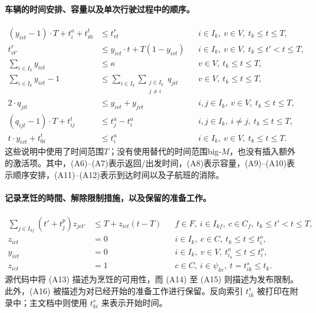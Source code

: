 \documentclass{article}
\begin{document}
\paragraph{车辆的时间安排、容量以及单次行驶过程中的顺序。}
\begin{align}
(y_{ivt}-1)\cdot T+t_i^a+t_{i0}^t
 &\leq t_{vt}^r
 &&i\in I_k,\ v\in V,\ t_k\leq t\leq T, \tag{A6}\\
t_{vt'}^r
 &\leq y_{ivt}\cdot t+T(1-y_{ivt})
 &&i\in I_k,\ v\in V,\ t_k\leq t'<t\leq T, \tag{A7}\\
\sum_{i\in I_k}y_{ivt}
 &\leq\kappa
 &&v\in V,\ t_k\leq t\leq T, \tag{A8}\\
\sum_{i\in I_k}y_{ivt}-1
 &\leq\sum_{i\in I_k}\sum_{\substack{j\in I_k\\j\ne i}}q_{jit}
 &&v\in V,\ t_k\leq t\leq T, \tag{A9}\\
2\cdot q_{jit}
 &\leq y_{ivt}+y_{jvt}
 &&i,j\in I_k,\ v\in V,\ t_k\leq t\leq T, \tag{A10}\\
(q_{ijt}-1)\cdot T+t_{ij}^t
 &\leq t_j^a-t_i^a
 &&i,j\in I_k,\ i\ne j,\ t_k\leq t\leq T, \tag{A11}\\
t\cdot y_{ivt}+t_{0i}^t
 &\leq t_i^a
 &&i\in I_k,\ v\in V,\ t_k\leq t\leq T. \tag{A12}
\end{align}
这些说明中使用了时间范围\(T\)；没有使用替代的时间范围big-\(M\)，也没有插入额外的激活项。其中，(A6)--(A7)表示返回/出发时间，(A8)表示容量，(A9)--(A10)表示顺序安排，(A11)--(A12)表示到达时间以及子航班的消除。

\paragraph{记录烹饪的時間、解除限制措施，以及保留的准备工作。}
\begin{align}
\sum_{j\in I_{kf}}(t'+t_j^p)z_{jct'}
 &\leq T+z_{ict}(t-T)
 &&f\in F,\ i\in I_{kf},\ c\in C_f,\ t_k\leq t'<t\leq T, \tag{A13}\\
z_{ict}&=0
 &&i\in I_k,\ c\in C,\ t_k\leq t\leq t_i^o, \tag{A14}\\
y_{ivt}&=0
 &&i\in I_k,\ v\in V,\ t_{i_k}^o\leq t\leq t_i^o, \tag{A15}\\
z_{ict}&=1
 &&c\in C,\ i\in\psi_{kc},\ t=t_{ik}^s\leq t_k. \tag{A16}
\end{align}
源代码中将 (A13) 描述为烹饪的可用性，而 (A14) 至 (A15) 则描述为发布限制。此外，(A16) 被描述为对已经开始的准备工作进行保留。反向索引 \(t_{ik}^s\) 被打印在附录中；主文档中则使用 \(t_{ki}^s\) 来表示开始时间。
\end{document}
